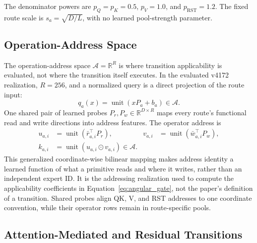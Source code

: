 \documentclass{article}
\newcommand{\R}{\mathbb{R}}
\newcommand{\od}{\mathbin{\odot}}
\begin{document}
The denominator powers are \(p_Q=p_K=0.5\), \(p_V=1.0\), and
\(p_{\mathrm{RST}}=1.2\). The fixed route scale is \(s_a=\sqrt{D/L}\), with no
learned pool-strength parameter.

\subsection{Operation-Address Space}
\label{sec:operation-space}

The operation-address space \(\mathcal{A}=\R^R\) is where transition
applicability is evaluated, not where the transition itself executes. In the
evaluated v4172 realization, \(R=256\), and a normalized query is a direct
projection of the route input:
\begin{equation}
q_a(x)=\operatorname{unit}(xP_a+b_a)\in\mathcal{A}.
\label{eq:query}
\end{equation}
One shared pair of learned probes \(P_r,P_w\in\R^{D\times R}\) maps every
route's functional read and write directions into address features. The
operator address is
\begin{align}
u_{a,i}&=\operatorname{unit}(\bar r_{a,i}^{\top}P_r),&
v_{a,i}&=\operatorname{unit}(\bar w_{a,i}^{\top}P_w),\nonumber\\
k_{a,i}&=\operatorname{unit}(u_{a,i}\od v_{a,i})\in\mathcal{A}.
\label{eq:rw_address}
\end{align}
This generalized coordinate-wise bilinear mapping makes address identity a
learned function of what a primitive reads and where it writes, rather than an
independent expert ID. It is the addressing realization used to compute the
applicability coefficients in Equation~\ref{eq:angular_gate}, not the paper's
definition of a transition. Shared probes align QK, V, and RST addresses to one
coordinate convention, while their operator rows remain in route-specific
pools.

\subsection{Attention-Mediated and Residual Transitions}
\label{sec:block}
\end{document}
